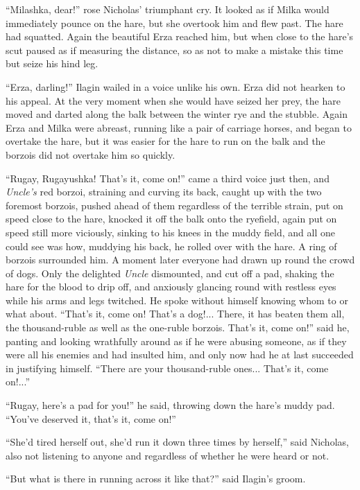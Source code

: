 ``Milashka, dear!'' rose Nicholas' triumphant cry. It looked as
if Milka would immediately pounce on the hare, but she overtook
him and flew past. The hare had squatted. Again the beautiful
Erza reached him, but when close to the hare's scut paused as if
measuring the distance, so as not to make a mistake this time but
seize his hind leg.

``Erza, darling!'' Ilagin wailed in a voice unlike his own. Erza
did not hearken to his appeal. At the very moment when she would
have seized her prey, the hare moved and darted along the balk
between the winter rye and the stubble. Again Erza and Milka were
abreast, running like a pair of carriage horses, and began to
overtake the hare, but it was easier for the hare to run on the
balk and the borzois did not overtake him so quickly.

``Rugay, Rugayushka! That's it, come on!'' came a third voice
just then, and \emph{Uncle's} red borzoi, straining and curving
its back, caught up with the two foremost borzois, pushed ahead
of them regardless of the terrible strain, put on speed close to
the hare, knocked it off the balk onto the ryefield, again put on
speed still more viciously, sinking to his knees in the muddy
field, and all one could see was how, muddying his back, he
rolled over with the hare. A ring of borzois surrounded him. A
moment later everyone had drawn up round the crowd of dogs. Only
the delighted \emph{Uncle} dismounted, and cut off a pad, shaking
the hare for the blood to drip off, and anxiously glancing round
with restless eyes while his arms and legs twitched. He spoke
without himself knowing whom to or what about. ``That's it, come
on! That's a dog!... There, it has beaten them all, the
thousand-ruble as well as the one-ruble borzois. That's it, come
on!'' said he, panting and looking wrathfully around as if he
were abusing someone, as if they were all his enemies and had
insulted him, and only now had he at last succeeded in justifying
himself. ``There are your thousand-ruble ones... That's it, come
on!...''

``Rugay, here's a pad for you!'' he said, throwing down the
hare's muddy pad. ``You've deserved it, that's it, come on!''

``She'd tired herself out, she'd run it down three times by
herself,'' said Nicholas, also not listening to anyone and
regardless of whether he were heard or not.

``But what is there in running across it like that?'' said
Ilagin's groom.

